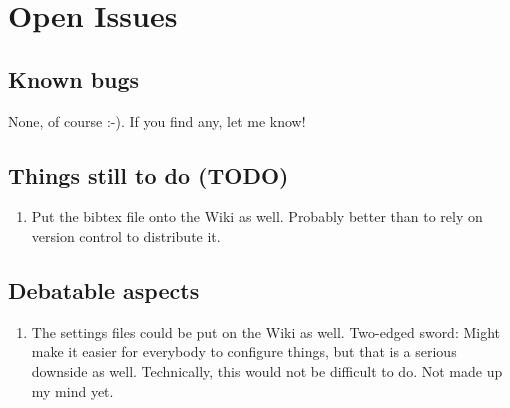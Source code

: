 \documentclass[a4paper,10pt,english]{sphinxmanual}
\begin{document}
\chapter{Open Issues}
\label{openissues::doc}\label{openissues:open-issues}

\section{Known bugs}
\label{openissues:known-bugs}
None, of course :-). If you find any, let me know!


\section{Things still to do (TODO)}
\label{openissues:things-still-to-do-todo}\begin{enumerate}
\item {} 
Put the bibtex file onto the Wiki as
well. Probably better than to rely on version
control to distribute it.

\end{enumerate}


\section{Debatable aspects}
\label{openissues:debatable-aspects}\begin{enumerate}
\item {} 
The settings files could be put on the Wiki as
well. Two-edged sword: Might make it easier for
everybody to configure things, but that is a
serious downside as well. Technically, this would
not be difficult to do. Not made up my mind yet.

\end{enumerate}
\end{document}
